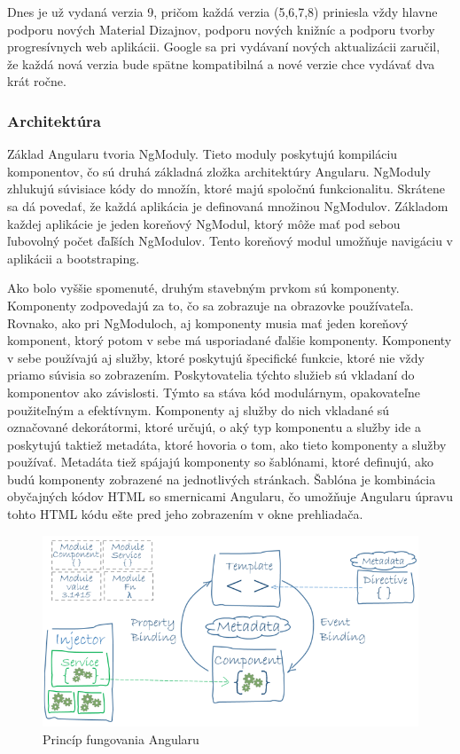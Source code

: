 \indent Dnes je už vydaná verzia 9, pričom každá verzia (5,6,7,8) priniesla vždy hlavne podporu nových Material Dizajnov, podporu nových knižníc a podporu tvorby progresívnych web aplikácii. Google sa pri vydávaní nových aktualizácii zaručil, že každá nová verzia bude spätne kompatibilná a nové verzie chce vydávať dva krát ročne.

\subsubsection{Architektúra}
\indent Základ Angularu tvoria NgModuly. Tieto moduly poskytujú kompiláciu komponentov, čo sú druhá základná zložka architektúry Angularu. NgModuly zhlukujú súvisiace kódy do množín, ktoré majú spoločnú funkcionalitu. Skrátene sa dá povedať, že každá aplikácia je definovaná množinou NgModulov. Základom každej aplikácie je jeden koreňový NgModul, ktorý môže mať pod sebou ľubovolný počet ďaľších NgModulov. Tento koreňový modul umožňuje navigáciu v aplikácii a bootstraping. 

\indent Ako bolo vyššie spomenuté, druhým stavebným prvkom sú komponenty. Komponenty zodpovedajú za to, čo sa zobrazuje na obrazovke používateľa. Rovnako, ako pri NgModuloch, aj komponenty musia mať jeden koreňový komponent, ktorý potom v sebe má usporiadané ďalšie komponenty. Komponenty v sebe používajú aj služby, ktoré poskytujú špecifické funkcie, ktoré nie vždy priamo súvisia so zobrazením. Poskytovatelia týchto služieb sú vkladaní do komponentov ako závislosti. Týmto sa stáva kód modulárnym, opakovateľne použiteľným a efektívnym. Komponenty aj služby do nich vkladané sú označované dekorátormi, ktoré určujú, o aký typ komponentu a služby ide a poskytujú taktiež metadáta, ktoré hovoria o tom, ako tieto komponenty a služby používať. Metadáta tiež spájajú komponenty so šablónami, ktoré definujú, ako budú komponenty zobrazené na jednotlivých stránkach. Šablóna je kombinácia obyčajných kódov HTML so smernicami Angularu, čo umožňuje Angularu úpravu tohto HTML kódu ešte pred jeho zobrazením v okne prehliadača. 

\begin{figure}[H]
    \centering
    \includegraphics[scale=0.5]{img/angular_architecture.png}
    \caption{Princíp fungovania Angularu}
    \label{fig:angular_architecture}
\end{figure}

